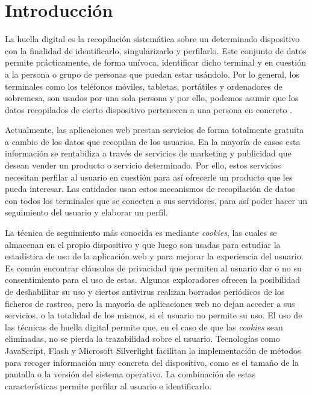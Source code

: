 \chapter{Introducción}
\label{ch:introduccion}

La huella digital es la recopilación sistemática sobre un determinado dispositivo con la finalidad de identificarlo, singularizarlo y perfilarlo. Este conjunto de datos permite prácticamente, de forma unívoca, identificar dicho terminal y en cuestión a la persona o grupo de personas que puedan estar usándolo. Por lo general, los terminales como los teléfonos móviles, tabletas, portátiles y ordenadores de sobremesa, son usados por una sola persona y por ello, podemos asumir que los datos recopilados de cierto dispositivo pertenecen a una persona en concreto \cite{aepd}.\par

Actualmente, las aplicaciones web prestan servicios de forma totalmente gratuita a cambio de los datos que recopilan de los usuarios. En la mayoría de casos esta información se rentabiliza a través de servicios de marketing y publicidad que desean vender un producto o servicio determinado. Por ello, estos servicios necesitan perfilar al usuario en cuestión para así ofrecerle un producto que les pueda interesar. Las entidades usan estos mecanismos de recopilación de datos con todos los terminales que se conecten a sus servidores, para así poder hacer un seguimiento del usuario y elaborar un perfil.\par

La técnica de seguimiento más conocida es mediante \textit{cookies}, las cuales se almacenan en el propio dispositivo y que luego son usadas para estudiar la estadística de uso de la aplicación web y para mejorar la experiencia del usuario. Es común encontrar cláusulas de privacidad que permiten al usuario dar o no su consentimiento para el uso de estas. Algunos exploradores ofrecen la posibilidad de deshabilitar su uso y ciertos antivirus realizan borrados periódicos de los ficheros de rastreo, pero la mayoría de aplicaciones web no dejan acceder a sus servicios, o la totalidad de los mismos, si el usuario no permite su uso. El uso de las técnicas de huella digital permite que, en el caso de que las \textit{cookies} sean eliminadas, no se pierda la trazabilidad sobre el usuario. Tecnologías como JavaScript, Flash y Microsoft Silverlight facilitan la implementación de métodos para recoger información muy concreta del dispositivo, como es el tamaño de la pantalla o la versión del sistema operativo. La combinación de estas características permite perfilar al usuario e identificarlo.  \par

